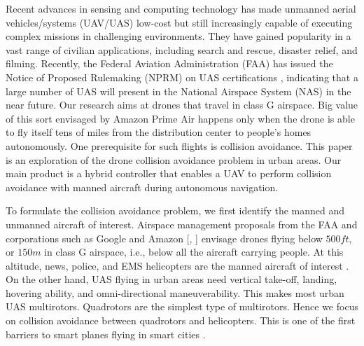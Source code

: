 \documentclass[journal,11pt,onecolumn,draftclsnofoot,]{IEEEtran}
\begin{document}
Recent advances in sensing and computing technology has made unmanned aerial vehicles/systems (UAV/UAS) low-cost but still increasingly capable of executing complex missions in challenging environments. They have gained popularity in a vast range of civilian applications, including search and rescue, disaster relief, and filming. Recently, the Federal Aviation Administration (FAA) has issued the Notice of Proposed Rulemaking (NPRM) on UAS certifications \cite{faa-nprm}, indicating that a large number of UAS will present in the National Airspace System (NAS) in the near future. Our research aims at drones that travel in class G airspace. Big value of this sort envisaged by Amazon Prime Air \cite{amazon_whitepaper_safe_access} happens only when the drone is able to fly itself tens of miles from the distribution center to people's homes autonomously. One prerequisite for such flights is collision avoidance. This paper is an exploration of the drone collision avoidance problem in urban areas. Our main product is a hybrid controller that enables a UAV to perform collision avoidance with manned aircraft during autonomous navigation. 

To formulate the collision avoidance problem, we first identify the manned and unmanned aircraft of interest. Airspace management proposals from the FAA \cite{faa-nprm} and corporations such as Google \cite{google_airspace_system} and Amazon [, ] envisage drones flying below $500ft$, or $150m$ in class G airspace, i.e., below all the aircraft carrying people. At this altitude, news, police, and EMS helicopters are the manned aircraft of interest \cite{google_airspace_system}. On the other hand, UAS flying in urban areas need vertical take-off, landing, hovering ability, and omni-directional maneuverability. This makes most urban UAS multirotors. Quadrotors are the simplest type of multirotors. Hence we focus on collision avoidance between quadrotors and helicopters. This is one of the first barriers to smart planes flying in smart cities \cite{google_airspace_system}.
\end{document}

